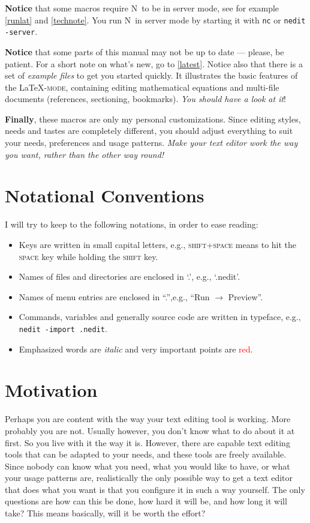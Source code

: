 \documentclass{article}
\newcommand{\latexpack}{\LaTeX-\textsc{mode}}
\newcommand{\nedit}{N\kern-0.8pt{Edit}}
\newcommand{\keyname}[1]{\textsc{#1}}
\newcommand{\file}[1]{`#1'}
\newcommand{\menu}[1]{``#1''}
\begin{document}
\textbf{Notice} that some macros require \nedit\ to be in server mode, see for example \ref{runlat} and \ref{technote}. You run \nedit\ in server mode by starting it with  \verb|nc| or \verb|nedit -server|.

\textbf{Notice} that some parts of this manual may not be up to date --- please, be patient. For a short note on what's new, go to \ref{latest}. 
Notice also that there is a set of \emph{example files} to get you started quickly. It  illustrates the basic features of the \latexpack, containing editing mathematical equations and multi-file documents (references, sectioning, bookmarks). \emph{You should have a look at it}!

\textbf{Finally}, these macros are only my personal customizations. Since editing styles, needs and tastes are completely different, you should adjust everything to suit your needs, preferences and usage patterns. \emph{Make your text editor work the way you want, rather than the other way round!}

\newpage
\section*{Notational Conventions}
I will try to keep to the following notations, in order to ease reading:

\begin{itemize}
\item Keys are written in small capital letters, e.g., \keyname{shift+space} means to hit the \keyname{space} key while holding the \keyname{shift} key.
\item Names of files and directories are enclosed in \file{.}, e.g., \file{.nedit}.
\item Names of menu entries are enclosed in \menu{.},e.g., \menu{Run $\to$ Preview}.
\item Commands, variables and generally source code are written in typeface, e.g., \texttt{nedit -import .nedit}.
\item Emphasized words are \emph{italic} and very important points are \textcolor{red}{red}.
\end{itemize}


\newpage



\section{Motivation} 
Perhaps you are content with the way your text editing tool is working. More probably you are not. Usually however, you don't know what to do about it at first. So you live with it the way it is. However, there are capable text editing tools that can be adapted to your needs, and these tools are freely available. Since nobody can know what you need, what you would like to have, or what your usage patterns are, realistically the only possible way to get a text editor that does what you want is that you configure it in such a way yourself. The only questions are how can this be done, how hard it will be, and how long it will take? This means basically, will it be worth the effort? 
\end{document}
